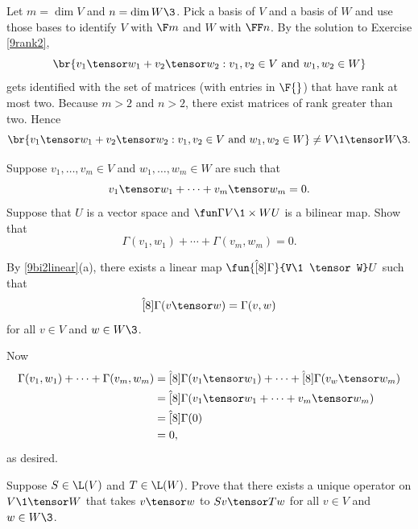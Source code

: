 \begin{Solution}
Let $m = \dim V$ and $n = \dim W\3$. Pick a basis of $V$ and a basis of $W$ and use those bases to identify $V$ with $\F m$ and $W$ with $\FF n$. By the solution to Exercise \ref{9rank2},
\[
\br{ v_1 \tensor w_1 + v_2 \tensor w_2 : v_1, v_2 \in V \text{ and } w_1, w_2 \in W }
\]
gets identified with the set of  matrices (with entries in $\F{}$) that have rank at most two. Because $m > 2$ and $n > 2$, there exist  matrices of rank greater than two. Hence
\[
\br{ v_1 \tensor w_1 + v_2 \tensor w_2 : v_1, v_2 \in V \text{ and } w_1, w_2 \in W } \ne V\1 \tensor W\3.
\]
\end{Solution}

\exercise
Suppose $v_1, \ldots, v_m \in V$ and $w_1, \ldots,w_m \in W$ are such that
\[
v_1 \tensor w_1 + \cdots + v_m \tensor w_m = 0.
\]
Suppose that $U$ is a vector space and $\fun \Gamma {V\1 \times W} U$ is a bilinear map.
Show that
\[
\Gamma(v_1, w_1) + \cdots + \Gamma(v_m, w_m) = 0.
\]
\exercisedisplayend

\begin{Solution}
By \ref{9bi2linear}(a), there exists a linear map $\fun {\hat[8]{\Gamma}} {V\1 \tensor W} U$ such that
\[
\hat[8]{\Gamma}(v \tensor w) = \Gamma(v, w)
\]
for all $v \in V$ and $w \in W\3$.

Now
\begin{align*}
\Gamma(v_1, w_1) + \cdots + \Gamma(v_m, w_m) &= \hat[8]{\Gamma}(v_1 \tensor w_1) + \cdots + \hat[8]{\Gamma}(v_w \tensor w_m) \\
&= \hat[8]{\Gamma}(v_1 \tensor w_1 + \cdots + v_m \tensor w_m ) \\
&= \hat[8]{\Gamma}(0) \\
&= 0,
\end{align*}
as desired.
\end{Solution}

\exercise
Suppose $S \in \L(V)$ and $T \in \L(W)$. Prove that there exists a unique operator on $V\1 \tensor W$ that takes
$v \tensor w$ to $Sv \tensor Tw$ for all $v \in V$ and $w \in W\3$.
\label{9LVtenLW}

